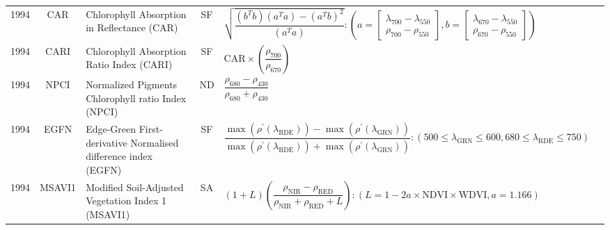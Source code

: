 \documentclass[10pt]{article}
\begin{document}
\begin{ThreePartTable}
\begin{longtable}{c c m{2.3in} c M{2.8in} M{1.5in}}
  1994 & CAR     & Chlorophyll Absorption in Reflectance (CAR)                                    & SF & $\sqrt{\dfrac{(b^Tb)(a^Ta)-(a^Tb)^2}{(a^Ta)}} :\left(a=\begin{bmatrix}\lambda_{700}-\lambda_{550}\\\rho_{700}-\rho_{550}\end{bmatrix},b=\begin{bmatrix}\lambda_{670}-\lambda_{550}\\\rho_{670}-\rho_{550}\end{bmatrix}\right)$                                                          & \citet{Kim1994}                                     \\
  1994 & CARI    & Chlorophyll Absorption Ratio Index (CARI)                                      & SF & $\text{CAR}\times\left(\dfrac{\rho_{700}}{\rho_{670}}\right)$                                                                                                                                                                                                                           & \citet{Kim1994}                                     \\
  1994 & NPCI    & Normalized Pigments Chlorophyll ratio Index (NPCI)                             & ND & $\dfrac{\rho_{680}-\rho_{430}}{\rho_{680}+\rho_{430}}$                                                                                                                                                                                                                                  & \citet{Penuelas1994}                                \\
  1994 & EGFN    & Edge-Green First-derivative Normalised difference index (EGFN)                 & SF & $\dfrac{\max(\rho^\prime(\lambda_\text{RDE}))-\max(\rho^\prime(\lambda_\text{GRN}))}{\max(\rho^\prime(\lambda_\text{RDE}))+\max(\rho^\prime(\lambda_\text{GRN}))} : (500\le\lambda_\text{GRN}\le600,680\le\lambda_\text{RDE}\le750)$                                                    & \citet{Penuelas1994}                                \\
  1994 & MSAVI1  & Modified Soil-Adjusted Vegetation Index 1 (MSAVI1)                             & SA & $(1 + L)\left(\dfrac{\rho_\text{NIR}-\rho_\text{RED}}{\rho_\text{NIR}+\rho_\text{RED}+L}\right):(L=1-2a\times\text{NDVI}\times\text{WDVI},a=1.166)$                                                                                                                                     & \citet{Qi1994,Huete1984}                            \\

\end{longtable}
\end{ThreePartTable}
\end{document}

